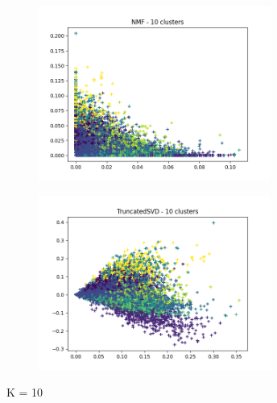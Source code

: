 \documentclass[11pt]{article}
\begin{document}
\begin{appendices}
\begin{figure}[H]
\centering
\begin{subfigure}{\textwidth}
  \centering
  \includegraphics[width=3in]{images/nmf_10.png}
  \label{fig:nmf10}
\end{subfigure}%
\begin{subfigure}{\textwidth}
  \centering
  \includegraphics[width=3in]{images/svd_10.png}
  \label{fig:svd10}
\end{subfigure}
\caption{K = 10}
\label{fig:k10}
\end{figure}


\end{appendices}
\end{document}
